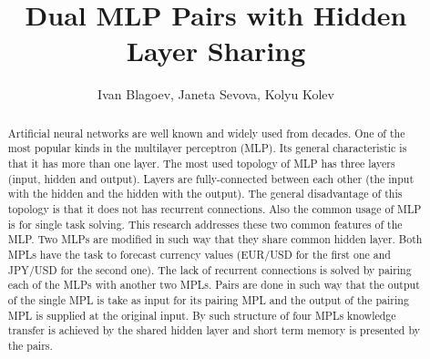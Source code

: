 \documentclass{llncs}
\begin{document}
\title{Dual MLP Pairs with Hidden Layer Sharing}

\author{Ivan Blagoev, Janeta Sevova, Kolyu Kolev}




\maketitle


\begin{abstract}

Artificial neural networks are well known and widely used from decades. One of the most popular kinds in the multilayer perceptron (MLP). Its general characteristic is that it has more than one layer. The most used topology of MLP has three layers (input, hidden and output). Layers are fully-connected between each other (the input with the hidden and the hidden with the output). The general disadvantage of this topology is that it does not has recurrent connections. Also the common usage of MLP is for single task solving. This research addresses these two common features of the MLP. Two MLPs are modified in such way that they share common hidden layer. Both MPLs have the task to forecast currency values (EUR/USD for the first one and JPY/USD for the second one). The lack of recurrent connections is solved by pairing each of the MLPs with another two MPLs. Pairs are done in such way that the output of the single MPL is take as input for its pairing MPL and the output of the pairing MPL is supplied at the original input. By such structure of four MPLs knowledge transfer is achieved by the shared hidden layer and short term memory is presented by the pairs. 

\end{abstract}
\end{document}
